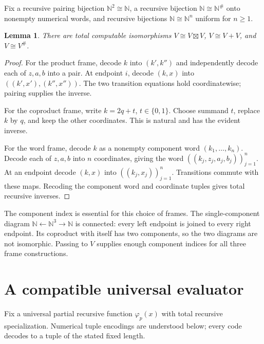 \documentclass[11pt]{article}
\newtheorem{lemma}[theorem]{Lemma}
\newcommand{\N}{\mathbb N}
\begin{document}
Fix a recursive pairing bijection $\N^2\cong\N$, a recursive
bijection $\N\cong\N^\#$ onto nonempty numerical words, and
recursive bijections $\N\cong\N^n$ uniform for $n\ge1$.

\begin{lemma}\label{lem:frames}
There are total computable isomorphisms
$V\cong V\boxtimes V$, $V\cong V+V$, and $V\cong V^\#$.
\end{lemma}
\begin{proof}
For the product frame, decode $k$ into $(k',k'')$ and independently
decode each of $z,a,b$ into a pair. At endpoint $i$, decode
$(k,x)$ into $((k',x'),(k'',x''))$. The two transition equations
hold coordinatewise; pairing supplies the inverse.

For the coproduct frame, write $k=2q+t$, $t\in\{0,1\}$.
Choose summand $t$, replace $k$ by $q$, and keep the other
coordinates. This is natural and has the evident inverse.

For the word frame, decode $k$ as a nonempty component word
$(k_1,\ldots,k_n)$. Decode each of $z,a,b$ into $n$ coordinates,
giving the word
$((k_j,z_j,a_j,b_j))_{j=1}^n$.
At an endpoint decode $(k,x)$ into $((k_j,x_j))_{j=1}^n$.
Transitions commute with these maps. Recoding the component
word and coordinate tuples gives total recursive inverses.
\end{proof}

The component index is essential for this choice of frames.
The single-component diagram
$\N\leftarrow\N^3\to\N$ is connected: every left endpoint
is joined to every right endpoint. Its coproduct with itself
has two components, so the two diagrams are not isomorphic.
Passing to $V$ supplies enough component indices for all three
frame constructions.

\section{A compatible universal evaluator}\label{sec:evaluator}

Fix a universal partial recursive function $\varphi_p(x)$ with
total recursive specialization. Numerical tuple encodings are
understood below; every code decodes to a tuple of the stated
fixed length.
\end{document}

